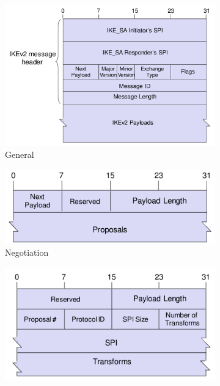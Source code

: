 \begin{figure}[h]
  \centering
  \begin{subfigure}{.4\textwidth}
    \centering
    \includegraphics[width=\textwidth]{figures/ike_message_format.png}
    \caption{General}\label{fig:ike_general_message}
  \end{subfigure}
  \hspace{.05\textwidth}
  \begin{subfigure}{.4\textwidth}
    \centering
    \includegraphics[width=\textwidth]{figures/ike_negotiation_structure.png}
    \caption{Negotiation}\label{fig:ike_negotiation_format}
  \end{subfigure}
  \begin{subfigure}{.4\textwidth}
    \centering
    \includegraphics[width=\textwidth]{figures/ike_proposal_structure.png}

\end{subfigure}
\end{figure}
